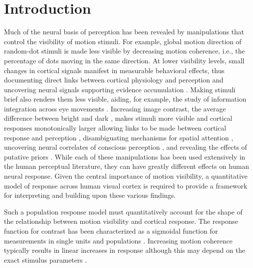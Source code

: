 
\section{Introduction}

Much of the neural basis of perception has been revealed by manipulations that control the visibility of motion stimuli. For example, global motion direction of random-dot stimuli is made less visible by decreasing motion coherence, i.e., the percentage of dots moving in the same direction. At lower visibility levels, small changes in cortical signals manifest in measurable behavioral effects, thus documenting direct links between cortical physiology and perception \citep{Britten1992-xy,Newsome1989-fr} and uncovering neural signals supporting evidence accumulation \citep{Huk2005-xg,Katz2016-xc,Roitman2002-mw,Shadlen1996-pr,Shadlen2001-uu}. Making stimuli brief also renders them less visible, aiding, for example, the study of information integration across eye movements \citep{Melcher2003-vw}. Increasing image contrast, the average difference between bright and dark \citep{Bex2002-it}, makes stimuli more visible and cortical responses monotonically larger allowing links to be made between cortical response and perception \citep{Boynton1999-jd,Ress2000-pa,Ress2003-lt}, disambiguating mechanisms for spatial attention \citep{Carrasco2000-es,Hara2014-tm,Hara2014-mv,Pestilli2011-gi}, uncovering neural correlates of conscious perception \citep{Lumer1998-qs,Wunderlich2005-ff}, and revealing the effects of putative priors \citep{Stocker2006-rk,Vintch2014-zu}. While each of these manipulations has been used extensively in the human perceptual literature, they can have greatly different effects on human neural response. Given the central importance of motion visibility, a quantitative model of response across human visual cortex is required to provide a framework for interpreting and building upon these various findings.

Such a population response model must quantitatively account for the shape of the relationship between motion visibility and cortical response. The response function for contrast has been characterized as a sigmoidal function for measurements in single units \citep{Albrecht1982-rq,Sclar1990-lk} and populations \citep{Avidan2002-jg,Boynton1996-ff,Boynton1999-jd,Gardner2005-pg,Logothetis2001-kk,Olman2004-dd,Tootell1998-mr}. Increasing motion coherence typically results in linear increases in response \citep{Aspell2005-tc,Britten1993-oh,Handel2007-xk,Rees2000-ul,Simoncelli1998-ts} although this may depend on the exact stimulus parameters \citep{Ajina2015-xm}.

